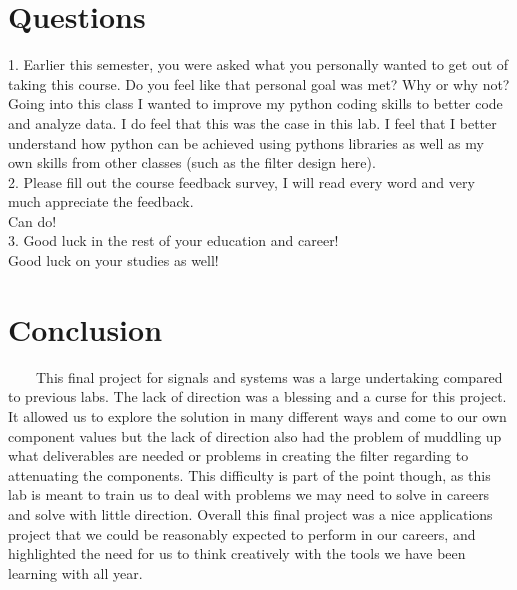 \documentclass[11pt,a4]{article}
\begin{document}
\section{Questions}

1. Earlier this semester, you were asked what you personally wanted to get out of taking this course. Do you feel like that personal goal was met? Why or why not?\\
Going into this class I wanted to improve my python coding skills to better code and analyze data. I do feel that this was the case in this lab. I feel that I better understand how python can be achieved using pythons libraries as well as my own skills from other classes (such as the filter design here).\\
2. Please fill out the course feedback survey, I will read every word and very much appreciate the feedback.\\
Can do!\\
3. Good luck in the rest of your education and career!\\
Good luck on your studies as well!\\


\section{Conclusion}

\ \ \ \ This final project for signals and systems was a large undertaking compared to previous labs. The lack of direction was a blessing and a curse for this project. It allowed us to explore the solution in many different ways and come to our own component values but the lack of direction also had the problem of muddling up what deliverables are needed or problems in creating the filter regarding to attenuating the components. This difficulty is part of the point though, as this lab is meant to train us to deal with problems we may need to solve in careers and solve with little direction. Overall this final project was a nice applications project that we could be reasonably expected to perform in our careers, and highlighted the need for us to think creatively with the tools we have been learning with all year.
\end{document}

